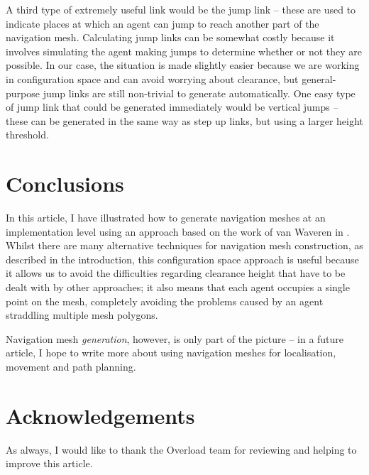 \documentclass[10pt,twocolumn]{article}
\begin{document}
A third type of extremely useful link would be the jump link -- these are used to indicate places at which an agent can jump to reach another part of the navigation mesh. Calculating jump links can be somewhat costly because it involves simulating the agent making jumps to determine whether or not they are possible. In our case, the situation is made slightly easier because we are working in configuration space and can avoid worrying about clearance, but general-purpose jump links are still non-trivial to generate automatically. One easy type of jump link that could be generated immediately would be vertical jumps -- these can be generated in the same way as step up links, but using a larger height threshold.

\section{Conclusions}

In this article, I have illustrated how to generate navigation meshes at an implementation level using an approach based on the work of van Waveren in \cite{vanwaveren01}. Whilst there are many alternative techniques for navigation mesh construction, as described in the introduction, this configuration space approach is useful because it allows us to avoid the difficulties regarding clearance height that have to be dealt with by other approaches; it also means that each agent occupies a single point on the mesh, completely avoiding the problems caused by an agent straddling multiple mesh polygons.

Navigation mesh \emph{generation}, however, is only part of the picture -- in a future article, I hope to write more about using navigation meshes for localisation, movement and path planning.

\section{Acknowledgements}

As always, I would like to thank the Overload team for reviewing and helping to improve this article.




\end{document}
